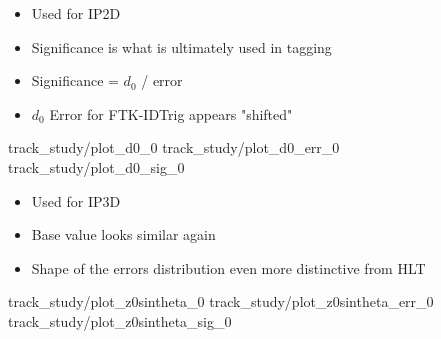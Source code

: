     { \begin{itemize}
        \item Used for IP2D
        \item Significance is what is ultimately used in tagging
        \item Significance = $d_0$ / error
        \item $d_0$ Error for FTK-IDTrig appears "shifted"
    \end{itemize} }
    {track_study/plot_d0_0}
    {track_study/plot_d0_err_0}
    {track_study/plot_d0_sig_0}
    { \begin{itemize}
        \item Used for IP3D
        \item Base value looks similar again
        \item Shape of the errors distribution even more distinctive from HLT
    \end{itemize} }
    {track_study/plot_z0sintheta_0}
    {track_study/plot_z0sintheta_err_0}
    {track_study/plot_z0sintheta_sig_0}
